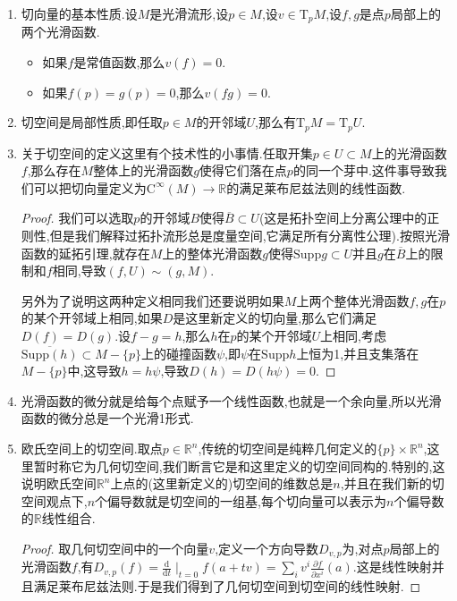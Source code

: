 \begin{enumerate}
	\item 切向量的基本性质.设$M$是光滑流形,设$p\in M$,设$v\in\mathrm{T}_pM$,设$f,g$是点$p$局部上的两个光滑函数.
	\begin{itemize}
		\item 如果$f$是常值函数,那么$v(f)=0$.
		\item 如果$f(p)=g(p)=0$,那么$v(fg)=0$.
	\end{itemize}
    \item 切空间是局部性质,即任取$p\in M$的开邻域$U$,那么有$\mathrm{T}_pM=\mathrm{T}_pU$.
    \item 关于切空间的定义这里有个技术性的小事情.任取开集$p\in U\subset M$上的光滑函数$f$,那么存在$M$整体上的光滑函数$g$使得它们落在点$p$的同一个芽中.这件事导致我们可以把切向量定义为$\mathrm{C}^{\infty}(M)\to\mathbb{R}$的满足莱布尼兹法则的线性函数.
    \begin{proof}
    	
    	我们可以选取$p$的开邻域$B$使得$\overline{B}\subset U$(这是拓扑空间上分离公理中的正则性,但是我们解释过拓扑流形总是度量空间,它满足所有分离性公理).按照光滑函数的延拓引理,就存在$M$上的整体光滑函数$g$使得$\mathrm{Supp}g\subset U$并且$g$在$\overline{B}$上的限制和$f$相同,导致$(f,U)\sim(g,M)$.
    	
    	\qquad
    	
    	另外为了说明这两种定义相同我们还要说明如果$M$上两个整体光滑函数$f,g$在$p$的某个开邻域上相同,如果$D$是这里新定义的切向量,那么它们满足$D(f)=D(g)$.设$f-g=h$,那么$h$在$p$的某个开邻域$U$上相同,考虑$\overline{\mathrm{Supp}(h)}\subset M-\{p\}$上的碰撞函数$\psi$,即$\psi$在$\mathrm{Supp}h$上恒为1,并且支集落在$M-\{p\}$中,这导致$h=h\psi$,导致$D(h)=D(h\psi)=0$.
    \end{proof}
    \item 光滑函数的微分就是给每个点赋予一个线性函数,也就是一个余向量,所以光滑函数的微分总是一个光滑1形式.
    \item 欧氏空间上的切空间.取点$p\in\mathbb{R}^n$,传统的切空间是纯粹几何定义的$\{p\}\times\mathbb{R}^n$,这里暂时称它为几何切空间,我们断言它是和这里定义的切空间同构的.特别的,这说明欧氏空间$\mathbb{R}^n$上点的(这里新定义的)切空间的维数总是$n$,并且在我们新的切空间观点下,$n$个偏导数就是切空间的一组基,每个切向量可以表示为$n$个偏导数的$\mathbb{R}$线性组合.
    \begin{proof}
    	
    	取几何切空间中的一个向量$v$,定义一个方向导数$D_{v,p}$为,对点$p$局部上的光滑函数$f$,有$D_{v,p}(f)=\frac{\mathrm{d}}{\mathrm{d}t}\mid_{t=0}f(a+tv)=\sum_iv^i\frac{\partial f}{\partial x^i}(a)$.这是线性映射并且满足莱布尼兹法则.于是我们得到了几何切空间到切空间的线性映射.
    	

\end{proof}
\end{enumerate}

